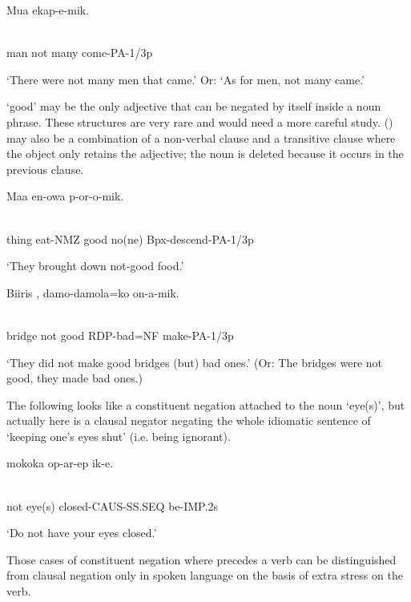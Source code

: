 \ea%
\label{ex:x1150}
\gll Mua    ekap-e-mik. \\
      \\
\glt
\z

man  not  many  come-PA-1/3p

`There were not many men that came.' Or: `As for men, not many came.'

 `good' may be the only adjective that can be negated by itself inside a noun phrase. These structures are very rare and would need a more careful study. () may also be a combination of a non-verbal clause and a transitive clause where the object  only retains the adjective; the noun is deleted because it occurs in the previous clause.

\ea%
\label{ex:x1106}
\gll Maa  en-owa    p-or-o-mik. \\
      \\
\glt
\z

thing  eat-NMZ  good  no(ne)  Bpx-descend-PA-1/3p

`They brought down not-good food.'

\ea%
\label{ex:x1107}
\gll Biiris  ,  damo-damola=ko  on-a-mik. \\
      \\
\glt
\z

bridge  not  good  RDP-bad=NF  make-PA-1/3p

`They did not make good bridges (but) bad ones.' (Or: The bridges were not good, they made bad ones.) 

The following looks like a constituent negation attached to the noun  `eye(s)', but actually   here is a clausal negator negating the whole idiomatic sentence of `keeping one's eyes shut' (i.e. being ignorant).

\ea%
\label{ex:x1114}
\gll {}  mokoka  op-ar-ep  ik-e. \\
      \\
\glt
\z

not  eye(s)  closed-CAUS-SS.SEQ  be-IMP.2s

`Do not have your eyes closed.'

Those cases of constituent negation where   precedes a verb can be distinguished from clausal negation only in spoken language on the basis of extra stress on the verb.

